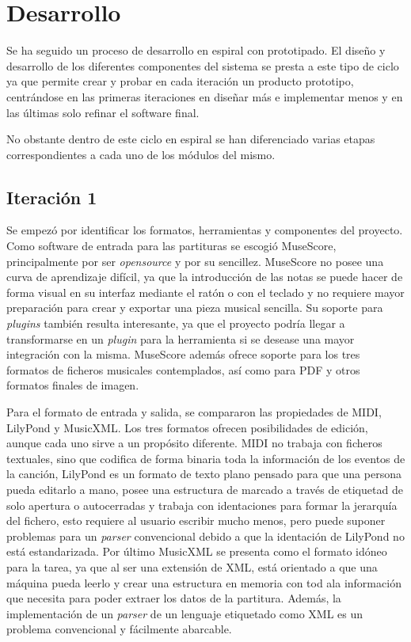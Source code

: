 \chapter{Desarrollo}
\minitoc
\label{chap:desarrollo}
Se ha seguido un proceso de desarrollo en espiral con prototipado. El diseño y desarrollo de los diferentes componentes del sistema se presta a este tipo de ciclo ya que permite crear y probar en cada iteración un producto prototipo, centrándose en las primeras iteraciones en diseñar más e implementar menos y en las últimas solo refinar el software final.

No obstante dentro de este ciclo en espiral se han diferenciado varias etapas correspondientes a cada uno de los módulos del mismo.

\section{Iteración 1}
Se empezó por identificar los formatos, herramientas y componentes del proyecto. Como software de entrada para las partituras se escogió MuseScore, principalmente por ser \textit{opensource} y por su sencillez. MuseScore no posee una curva de aprendizaje difícil, ya que la introducción de las notas se puede hacer de forma visual en su interfaz mediante el ratón o con el teclado y no requiere mayor preparación para crear y exportar una pieza musical sencilla. Su soporte para \textit{plugins} también resulta interesante, ya que el proyecto podría llegar a transformarse en un \textit{plugin} para la herramienta si se desease una mayor integración con la misma. MuseScore además ofrece soporte para los tres formatos de ficheros musicales contemplados, así como para PDF y otros formatos finales de imagen.

Para el formato de entrada y salida, se compararon las propiedades de MIDI, LilyPond y MusicXML. Los tres formatos ofrecen posibilidades de edición, aunque cada uno sirve a un propósito diferente. MIDI no trabaja con ficheros textuales, sino que codifica de forma binaria toda la información de los eventos de la canción, LilyPond es un formato de texto plano pensado para que una persona pueda editarlo a mano, posee una estructura de marcado a través de etiquetad de solo apertura o autocerradas y trabaja con identaciones para formar la jerarquía del fichero, esto requiere al usuario escribir mucho menos, pero puede suponer problemas para un \textit{parser} convencional debido a que la identación de LilyPond no está estandarizada. Por último MusicXML se presenta como el formato idóneo para la tarea, ya que al ser una extensión de XML, está orientado a que una máquina pueda leerlo y crear una estructura en memoria con tod ala información que necesita para poder extraer los datos de la partitura. Además, la implementación de un \textit{parser} de un lenguaje etiquetado como XML es un problema convencional y fácilmente abarcable.

